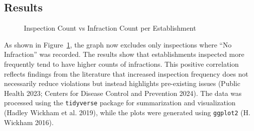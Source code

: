 \documentclass[
  letterpaper,
  DIV=11,
  numbers=noendperiod]{scrartcl}
\begin{document}
\newpage

\subsection{Results}\label{sec-data-results}

\begin{figure}


\caption{\label{fig-inspection-vs-infraction}Inspection Count vs
Infraction Count per Establishment}

\end{figure}%

As shown in Figure~\ref{fig-inspection-vs-infraction}, the graph now
excludes only inspections where ``No Infraction'' was recorded. The
results show that establishments inspected more frequently tend to have
higher counts of infractions. This positive correlation reflects
findings from the literature that increased inspection frequency does
not necessarily reduce violations but instead highlights pre-existing
issues (Public Health 2023; Centers for Disease Control and Prevention
2024). The data was processed using the \texttt{tidyverse} package for
summarization and visualization (Hadley Wickham et al. 2019), while the
plots were generated using \texttt{ggplot2} (H. Wickham 2016).

\newpage
\end{document}

